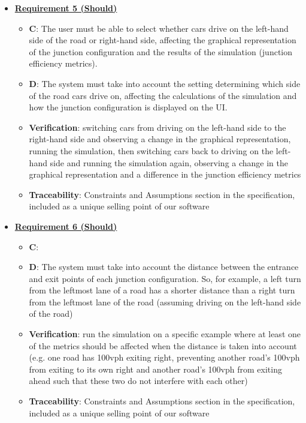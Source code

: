 \documentclass{article}
\begin{document}
\begin{itemize}
    \item \textbf{\underline{Requirement 5 (Should)}}
    \begin{itemize}
        \item \textbf{C}: The user must be able to select whether cars drive on the left-hand side of 
            the road or right-hand side, affecting the graphical representation of the junction
            configuration and the results of the simulation (junction efficiency metrics).
        \item \textbf{D}: The system must take into account the setting determining which side of
            the road cars drive on, affecting the calculations of the simulation and how 
            the junction configuration is displayed on the UI.
        \item \textbf{Verification}: switching cars from driving on the left-hand side to the 
            right-hand side and observing a change in the graphical representation, running 
            the simulation, then switching cars back to driving on the left-hand side and 
            running the simulation again, observing a change in the graphical representation 
            and a difference in the junction efficiency metrics
        \item\textbf{Traceability}: Constraints and Assumptions section in the specification, included 
            as a unique selling point of our software
    \end{itemize}

    \item \textbf{\underline{Requirement 6 (Should)}}
    \begin{itemize}
        \item \textbf{C}: 
        \item \textbf{D}: The system must take into account the distance between the entrance and exit 
            points of each junction configuration. So, for example, a left turn from the 
            leftmost lane of a road has a shorter distance than a right turn from the leftmost 
            lane of the road (assuming driving on the left-hand side of the road)
        \item \textbf{Verification}: run the simulation on a specific example where at least one of 
            the metrics should be affected when the distance is taken into account (e.g. one 
            road has 100vph exiting right, preventing another road’s 100vph from exiting to its
            own right and another road’s 100vph from exiting ahead such that these two do not 
            interfere with each other)
        \item\textbf{Traceability}: Constraints and Assumptions section in the specification, included 
            as a unique selling point of our software
    \end{itemize}


\end{itemize}
\end{document}
